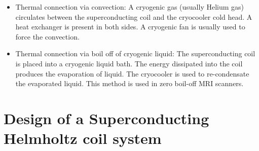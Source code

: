 \documentclass{ws-jmrr}
\begin{document}
\begin{multicols}{2}
\begin{itemize}[leftmargin=*]
\item Thermal connection via convection: A cryogenic gas (usually Helium gas) circulates between the superconducting coil and the cryocooler cold head. A heat exchanger is present in both sides. A cryogenic fan is usually used to force the convection.
\item  Thermal connection via boil off of cryogenic liquid: The superconducting coil is placed into a cryogenic liquid bath. The energy dissipated into the coil produces the evaporation of liquid. The cryocooler is used to re-condensate the evaporated liquid. This method is used in zero boil-off MRI scanners.
\end{itemize}

\section{Design of a Superconducting Helmholtz coil system}

\end{multicols}
\end{document}
